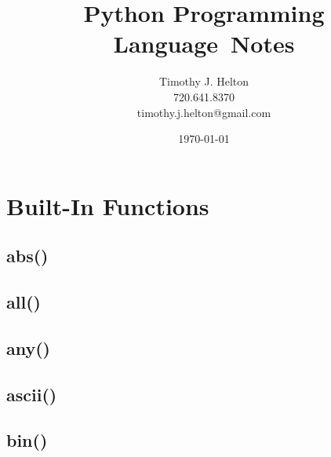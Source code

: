 \documentclass{article}
\newcommand{\topic}{Python Programming Language}
\begin{document}
\title{\topic \ Notes}
\author{Timothy J. Helton\\720.641.8370\\timothy.j.helton@gmail.com}
\date{\today}

\begin{titlingpage}
  \maketitle
\end{titlingpage}

\hypertarget{toc}{}
\tableofcontents
\newpage

\listoffigures
\listoftables
\newpage

\printnomenclature[0.75in]
\hfill

\newpage

\pagestyle{fancy}
\section{Built-In Functions}

\subsection{abs()}


\subsection{all()}


\subsection{any()}


\subsection{ascii()}


\subsection{bin()}


%
\end{document}
